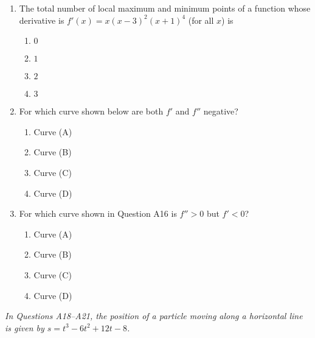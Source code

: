\documentclass[12pt]{article}
\begin{document}
\begin{enumerate}[label=\textbf{A\arabic*.},resume]
\item The total number of local maximum and minimum points of a function whose derivative is $f'(x)=x(x-3)^{2}(x+1)^{4}$ (for all $x$) is
\begin{enumerate}[label=(\Alph*)]
\item $0$ \item $1$ \item $2$ \item $3$
\end{enumerate}

\item For which curve shown below are both $f'$ and $f''$ negative?
\begin{center}
\end{center}

\begin{enumerate}[label=(\Alph*)]
\item Curve (A) \item Curve (B) \item Curve (C) \item Curve (D)
\end{enumerate}

\item For which curve shown in Question A16 is $f''>0$ but $f'<0$?
\begin{enumerate}[label=(\Alph*)]
\item Curve (A) \item Curve (B) \item Curve (C) \item Curve (D)
\end{enumerate}

\end{enumerate}

\medskip\noindent\textit{In Questions A18–A21, the position of a particle moving along a horizontal line is given by $s=t^{3}-6t^{2}+12t-8$.}
\end{document}

